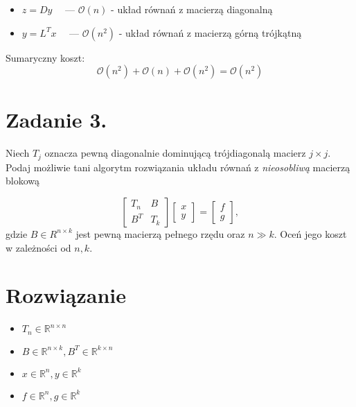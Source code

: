 \documentclass[a4paper]{article}
\newcommand{\R}{\mathbb R} %
\begin{document}
\begin{enumerate}[label=(\alph*)]
\begin{itemize}
                    \item
                        $z = D y \quad$ ---
                        $\mathcal{O}(n)$ - układ równań z macierzą diagonalną

                    \item
                        $y = L^{T} x \quad$ ---
                        $\mathcal{O}(n^{2})$ - układ równań z macierzą górną trójkątną

                \end{itemize}

                Sumaryczny koszt:
                \[\mathcal{O}(n^{2}) + \mathcal{O}(n) + \mathcal{O}(n^{2}) = \mathcal{O}(n^{2})\]

        \end{enumerate}


    \section*{Zadanie 3.}

        Niech $T_j$ oznacza pewną diagonalnie dominującą trójdiagonalą macierz $j \times j$.
        Podaj możliwie tani algorytm rozwiązania układu równań z \textit{nieosobliwą} macierzą blokową

        \[
            \begin{bmatrix}
                T_{n} & B \\
                B^{T} & T_{k}
            \end{bmatrix}
            \begin{bmatrix}
                x \\
                y
            \end{bmatrix}
            =
            \begin{bmatrix}
                f \\
                g
            \end{bmatrix},
        \]
        gdzie $B \in R^{n \times k}$ jest pewną macierzą pełnego rzędu oraz $n \gg k$.
        Oceń jego koszt w zależności od $n, k$.


    \section*{\large Rozwiązanie}

        \begin{itemize}
            \item
                $T_{n} \in \R^{n \times n}$

            \item
                $B \in \R^{n \times k}, B^{T} \in \R^{k \times n}$

            \item
                $x \in \R^{n}, y \in \R^{k}$

            \item
                $f \in \R^{n}, g \in \R^{k}$

        \end{itemize}
\end{document}
